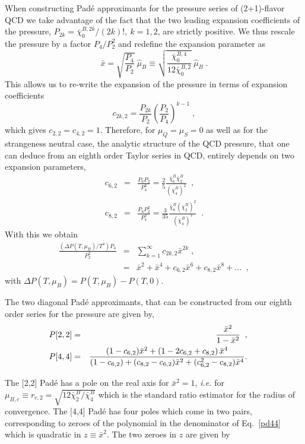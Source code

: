 \documentclass[pdflatex,prd,twocolumn,showpacs,superscriptaddress,nofootinbib]{revtex4-1}
\newcommand \hmu {\hat{\mu}}
\newcommand \xb {\bar{x}}
\newcommand \cb {\bar{\chi}}
\begin{document}
When constructing Pad\'e approximants
for the pressure series of (2+1)-flavor QCD we take advantage of the fact that 
the two leading expansion coefficients 
of the pressure, $P_{2k}=\cb_0^{B,2k}/(2k)!,\ k=1,2$, are 
strictly positive. We thus rescale the 
pressure by a factor $P_4/P_2^2$ and redefine the expansion parameter as
\begin{equation}
    \xb=\sqrt{\frac{P_{4}}{P_2}}\ \hmu_B\equiv \sqrt{\frac{\cb_0^{B,4}}{12\cb_0^{B,2}}}\ \hmu_B \; .
\end{equation}
This allows us to re-write the expansion of the 
pressure in terms of expansion coefficients 
\begin{equation}
 c_{2k,2}=\frac{P_{2k}}{P_2} \left(\frac{P_2}{P_{4}}\right)^{k-1}\; ,   \label{c2k2}
\end{equation}
which gives $c_{2,2}=c_{4,2}=1$.  Therefore, for  $\mu_Q=\mu_S=0$ as well as for the strangeness neutral case, the analytic structure of the QCD pressure, that one can deduce from an eighth order Taylor series in QCD, entirely depends on two expansion parameters, 
\begin{eqnarray}
    c_{6,2}&=&\frac{P_6 P_2}{P_4^2} = \frac{2}{5} \frac{\cb_6^B \cb_2^B}{(\cb_4^B)^2} \;\; ,\\
    c_{8,2}&=& \frac{P_8P_2^2}{P_4^3} = \frac{3}{35} \frac{\cb_8^B (\cb_2^B)^2}{(\cb_4^B)^3}
    \;\; .
    \label{parameter}
\end{eqnarray}
With this we obtain
\begin{eqnarray}
\frac{(\Delta P(T,\mu_B)/T^4) P_4}{P_2^2} &=&
\sum_{k=1}^{\infty} c_{2k,2} \xb^{2k}\; ,
\\
&=& \xb^2+\xb^4+ c_{6,2} \xb^6
+ c_{8,2} \xb^8 + ... \nonumber
\;   \; ,
\end{eqnarray}
with $\Delta P(T,\mu_B)=P(T,\mu_B)-P(T,0)$.

The two diagonal Pad\'e approximants, that can be constructed from our eighth order series
for the pressure are given by,
\begin{eqnarray}
    \hspace*{-0.5cm}P[2,2] &=& \frac{\xb^2}{1-\xb^2}\;\; ,  \label{pd22}\\
    \hspace*{-0.5cm}P[4,4] &=&  \frac{(1-c_{6,2}) \xb^2 +
\left(1 - 2 c_{6,2} +c_{8,2} \right) \xb^4}{(1-c_{6,2})+
(c_{8,2}-c_{6,2}) \xb^2 + (c_{6,2}^2 - c_{8,2}) \xb^4} .
\label{pd44}
\end{eqnarray}

The [2,2] Pad\'e has a pole on the real axis for
$\xb^2=1$, {\it i.e.} for
$\mu_{B,c}\equiv r_{c,2}=\sqrt{12\cb_2^B/\cb_4^B}$ which is the standard ratio estimator for the radius of 
convergence. The [4,4] Pad\'e has four poles which come in two pairs, corresponding to zeroes of the polynomial in the denominator of Eq.~\ref{pd44} which is quadratic in $z\equiv \xb^2$. The two zeroes in $z$ are given by 
\end{document}

